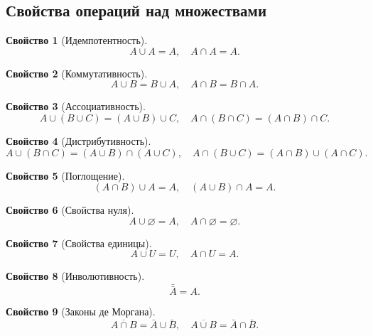 \documentclass[a5paper, 11pt]{extarticle}
\theoremstyle{definition}
\newtheorem{property}{Свойство}[subsection]
\theoremstyle{definition}
\theoremstyle{definition}
\numberwithin{figure}{section}
\numberwithin{table}{section}
\begin{document}
\subsection{Свойства операций над множествами}

\begin{property}[Идемпотентность]
    \[
        A \cup A = A,
        \quad
        A \cap A = A.
    \]
\end{property}

\begin{property}[Коммутативность]
    \[
        A \cup B = B \cup A,
        \quad
        A \cap B = B \cap A.
    \]
\end{property}

\begin{property}[Ассоциативность]
    \[
        A \cup (B \cup C) = (A \cup B) \cup C,
        \quad
        A \cap (B \cap C) = (A \cap B) \cap C.
    \]
\end{property}

\begin{property}[Дистрибутивность]
    \[
        A \cup (B \cap C) = (A \cup B) \cap (A \cup C),
        \quad
        A \cap (B \cup C) = (A \cap B) \cup (A \cap C).
    \]
\end{property}

\begin{property}[Поглощение]
    \[
        (A \cap B) \cup A = A,
        \quad
        (A \cup B) \cap A = A.
    \]
\end{property}

\begin{property}[Свойства нуля]
    \[
        A \cup \varnothing = A,
        \quad
        A \cap \varnothing = \varnothing.
    \]
\end{property}

\begin{property}[Свойства единицы]
    \[
        A \cup U = U,
        \quad
        A \cap U = A.
    \]
\end{property}

\begin{property}[Инволютивность]
    \[
        \bar{\bar{A}} = A.
    \]
\end{property}

\begin{property}[Законы де Моргана]
    \[
        \overline{A \cap B} = \bar{A} \cup \bar{B},
        \quad
        \overline{A \cup B} = \bar{A} \cap \bar{B}.
    \]
\end{property}
\end{document}
